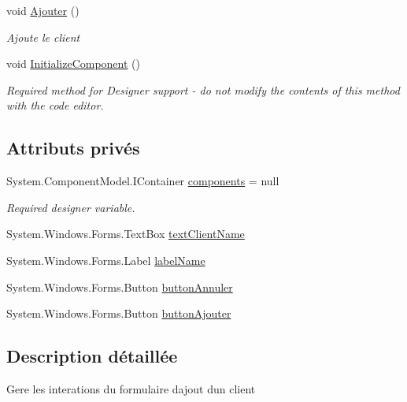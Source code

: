\begin{DoxyCompactItemize}
void \mbox{\hyperlink{class_m_t_connect_agent_1_1_form_ajout_client_a577a05b6d1bffbb16d75e961d5624a0a}{Ajouter}} ()
\begin{DoxyCompactList}\small\item\em Ajoute le client \end{DoxyCompactList}\item 
void \mbox{\hyperlink{class_m_t_connect_agent_1_1_form_ajout_client_ac1e2bea6992dcf441bfddec9445a56d5}{Initialize\+Component}} ()
\begin{DoxyCompactList}\small\item\em Required method for Designer support -\/ do not modify the contents of this method with the code editor. \end{DoxyCompactList}\end{DoxyCompactItemize}
\subsection*{Attributs privés}
\begin{DoxyCompactItemize}
\item 
System.\+Component\+Model.\+I\+Container \mbox{\hyperlink{class_m_t_connect_agent_1_1_form_ajout_client_aaa9221b352c79976eee17048d4a786db}{components}} = null
\begin{DoxyCompactList}\small\item\em Required designer variable. \end{DoxyCompactList}\item 
System.\+Windows.\+Forms.\+Text\+Box \mbox{\hyperlink{class_m_t_connect_agent_1_1_form_ajout_client_a2cf281bb548894189816027cfa340465}{text\+Client\+Name}}
\item 
System.\+Windows.\+Forms.\+Label \mbox{\hyperlink{class_m_t_connect_agent_1_1_form_ajout_client_af4bf6c8ff0e1b15b816788d941831a47}{label\+Name}}
\item 
System.\+Windows.\+Forms.\+Button \mbox{\hyperlink{class_m_t_connect_agent_1_1_form_ajout_client_a397961d7360c72e0e3565bf286cb7b9e}{button\+Annuler}}
\item 
System.\+Windows.\+Forms.\+Button \mbox{\hyperlink{class_m_t_connect_agent_1_1_form_ajout_client_a8de60d6a1ba7c6b10ba7cf6d60c9f6da}{button\+Ajouter}}
\end{DoxyCompactItemize}


\subsection{Description détaillée}
Gere les interations du formulaire d\textquotesingle{}ajout d\textquotesingle{}un client 



